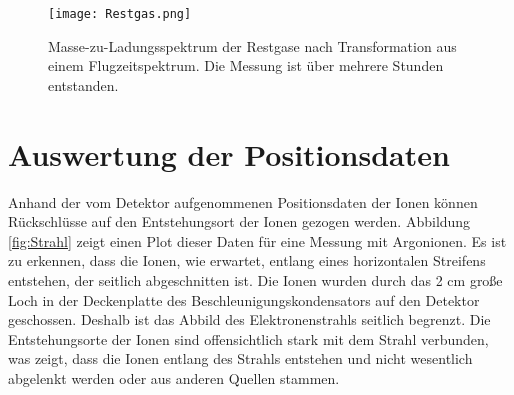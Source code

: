 \begin{figure}
    \hspace{-1.1cm}\texttt{[image: Restgas.png]}
    \caption[Masse-zu-Ladungsspektrum der Restgase]{Masse-zu-Ladungsspektrum der Restgase nach Transformation aus einem Flugzeitspektrum. Die Messung ist über mehrere Stunden entstanden.}
    \label{fig:rest}
\end{figure}

\section{Auswertung der Positionsdaten}
Anhand der vom Detektor aufgenommenen Positionsdaten der Ionen können Rückschlüsse auf den Entstehungsort der Ionen gezogen werden. Abbildung \ref{fig:Strahl} zeigt einen Plot dieser Daten für eine Messung mit Argonionen. Es ist zu erkennen, dass die Ionen, wie erwartet, entlang eines horizontalen Streifens entstehen, der seitlich abgeschnitten ist. Die Ionen wurden durch das 2 cm große Loch in der Deckenplatte des Beschleunigungskondensators auf den Detektor geschossen. Deshalb ist das Abbild des Elektronenstrahls seitlich begrenzt. Die Entstehungsorte der Ionen sind offensichtlich stark mit dem Strahl verbunden, was zeigt, dass die Ionen entlang des Strahls entstehen und nicht wesentlich abgelenkt werden oder aus anderen Quellen stammen.


